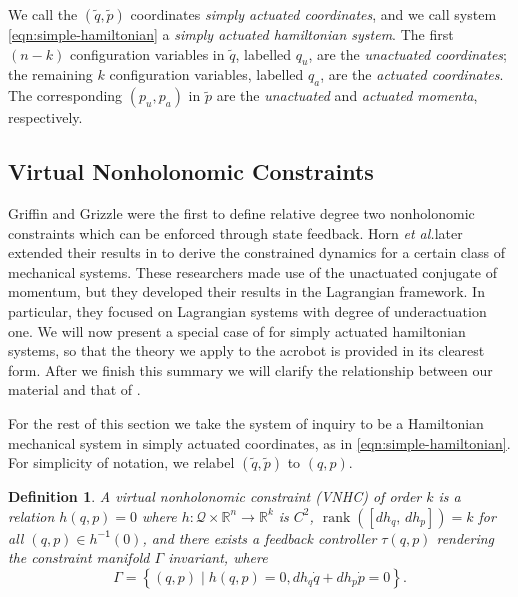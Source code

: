 \documentclass[journal,twoside,onecolumn,draftclsnofoot,web]{ieeecolor}
\newtheorem{defn}{Definition} %
\DeclareMathOperator{\Rank}{rank}
\newcommand*{\rank}[1]{\Rank\left(#1\right)}
\newcommand*{\inv}{^\mathsf{-1}}
\newcommand*{\R}{\mathbb{R}}
\newcommand*{\etal}{\MakeLowercase{\textit{et al.}}}
\begin{document}
We call the \((\tilde{q},\tilde{p})\) coordinates
\textit{simply actuated coordinates}, and we call system
\eqref{eqn:simple-hamiltonian} a \textit{simply actuated hamiltonian system}.
The first \((n-k)\) configuration variables in \(\tilde{q}\), labelled \(q_u\),
are the \textit{unactuated coordinates}; 
the remaining \(k\) configuration variables, labelled \(q_a\), are the
\textit{actuated coordinates}.
The corresponding \((p_u, p_a)\) in \(\tilde{p}\) are the \textit{unactuated}
and \textit{actuated momenta}, respectively.

\subsection{Virtual Nonholonomic Constraints}\label{sec:vnhc-vnhc}

Griffin and Grizzle \cite{nhvc_dynamic_walking} were the first to define
relative degree two nonholonomic constraints which can be enforced
through state feedback.
Horn \etal later extended their results in
\cite{hybrid_zero_dynamics_bipedal_nhvcs} to derive the constrained dynamics for
a certain class of mechanical systems.
These researchers made use of the unactuated conjugate of momentum, but they
developed their results in the Lagrangian framework.
In particular, they focused on Lagrangian systems with degree of underactuation
one.
We will now present a special case of \cite{hybrid_zero_dynamics_bipedal_nhvcs}
for simply actuated hamiltonian systems, so that the theory we apply to the
acrobot is provided in its clearest form.
After we finish this summary we will clarify the relationship between our
material and that of \cite{hybrid_zero_dynamics_bipedal_nhvcs}.

For the rest of this section we take the system of inquiry to be a
Hamiltonian mechanical system in simply actuated coordinates, as in
\eqref{eqn:simple-hamiltonian}.
For simplicity of notation, we relabel \((\tilde{q},\tilde{p})\) to \((q,p)\).

\begin{defn}\label{defn:vnhc}
    A \textit{virtual nonholonomic constraint} (VNHC) \textit{of order \(k\)} is a
    relation \(h(q,p) = 0\) where \(h : \mathcal{Q}\times\R^n \rightarrow \R^k\) is
    \(C^2\), \(\rank{\left[ dh_q,\, dh_p \right]} = k\) for all 
    \((q,p) \in h\inv(0)\), and there exists a feedback controller \(\tau(q,p)\)
    rendering the \textit{constraint manifold} \(\Gamma\) invariant,
    where
    \begin{equation}
        \Gamma = \left\{(q,p) \mid h(q,p) = 0, dh_q \dot{q} + dh_p \dot{p} = 0\right\}
        .
    \end{equation}
\end{defn}
\end{document}
